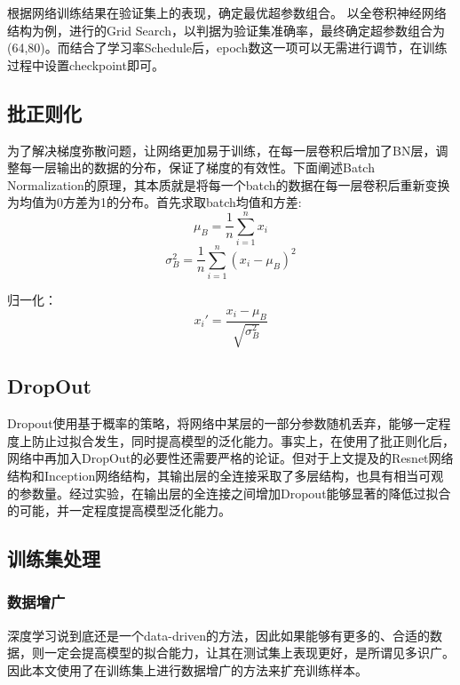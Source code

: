 \documentclass[UTF8]{ctexart}
\begin{document}
根据网络训练结果在验证集上的表现，确定最优超参数组合。
以全卷积神经网络结构为例，进行的Grid Search，以判据为验证集准确率，最终确定超参数组合为(64,80)。而结合了学习率Schedule后，epoch数这一项可以无需进行调节，在训练过程中设置checkpoint即可。


\subsection{批正则化}
为了解决梯度弥散问题，让网络更加易于训练，在每一层卷积后增加了BN层，调整每一层输出的数据的分布，保证了梯度的有效性。下面阐述Batch Normalization的原理，其本质就是将每一个batch的数据在每一层卷积后重新变换为均值为0方差为1的分布。首先求取batch均值和方差:
\begin{equation}
    \mu_B = \frac{1}{n}\sum^n_{i=1}x_i
\end{equation}
\begin{equation}
    \sigma_B^2 = \frac{1}{n}\sum^n_{i=1}(x_i-\mu_B)^2
\end{equation}

归一化：
\begin{equation}
    x_i'=\frac{x_i-\mu_B}{\sqrt{\sigma_B^2}}
\end{equation}

\subsection{DropOut}
Dropout使用基于概率的策略，将网络中某层的一部分参数随机丢弃，能够一定程度上防止过拟合发生，同时提高模型的泛化能力。事实上，在使用了批正则化后，网络中再加入DropOut的必要性还需要严格的论证。但对于上文提及的Resnet网络结构和Inception网络结构，其输出层的全连接采取了多层结构，也具有相当可观的参数量。经过实验，在输出层的全连接之间增加Dropout能够显著的降低过拟合的可能，并一定程度提高模型泛化能力。

\subsection{训练集处理}
\subsubsection{数据增广}
深度学习说到底还是一个data-driven的方法，因此如果能够有更多的、合适的数据，则一定会提高模型的拟合能力，让其在测试集上表现更好，是所谓见多识广。因此本文使用了在训练集上进行数据增广的方法来扩充训练样本。
\end{document}
